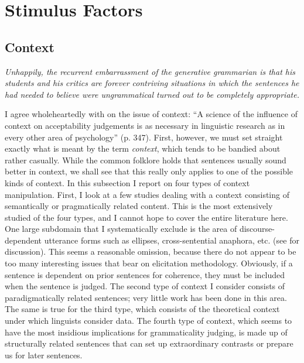 \section{Stimulus Factors} \label{sec:5.3}
\subsection{Context} \label{sec:5.3.1} 

\epigraph{\textit{Unhappily, the recurrent embarrassment of the generative grammarian is that his students and his critics are forever contriving situations in which the sentences he had needed to believe were ungrammatical turned out to be completely appropriate.}\\[-2\baselineskip]}{\citep{Fillmore1973}}

\noindent I agree wholeheartedly with \citet{Bever1970a} on the issue of context: ``A science of the influence of context on acceptability judgements is as necessary in linguistic research as in every other area of psychology'' (p. 347). First, however, we must set straight exactly what is meant by the term \textit{context}, which tends to be bandied about rather casually. While the common folklore holds that sentences usually sound better in context, we shall see that this really only applies to one of
the possible kinds of context. In this subsection I report on four types of context manipulation. First, I look at a few studies dealing with a context consisting of semantically or pragmatically related content. This is the most extensively studied of the four types, and I cannot hope to cover the entire literature here. One large subdomain that I systematically exclude is the area of discourse-dependent utterance forms such as ellipses, cross-sentential anaphora, etc. (see  \citet{vanDijk1977} for discussion). This seems a reasonable omission, because there do not appear to be too many interesting issues that bear on elicitation methodology. Obviously, if a sentence is dependent on prior sentences for coherence, they must be included when the sentence is judged. The second type of context I consider consists of paradigmatically related sentences; very little work has been done in this area. The same is true for the third type, which consists of the theoretical context under which linguists consider data. The fourth type of context, which seems to have the most insidious implications for grammaticality judging, is made up of structurally related sentences that can set up extraordinary contrasts or prepare us for later sentences.

